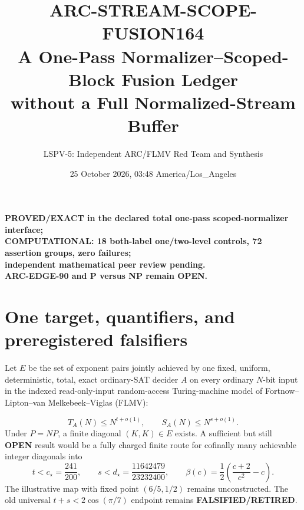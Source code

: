 \documentclass[11pt]{article}
\title{ARC-STREAM-SCOPE-FUSION164\\
\large A One-Pass Normalizer--Scoped-Block Fusion Ledger\\
without a Full Normalized-Stream Buffer}
\author{LSPV-5: Independent ARC/FLMV Red Team and Synthesis}
\date{25 October 2026, 03:48 America/Los\_Angeles}
\newcommand{\OPEN}{\textbf{OPEN}}
\begin{document}
\maketitle

\begin{center}
\textbf{PROVED/EXACT in the declared total one-pass scoped-normalizer interface;}\\
\textbf{COMPUTATIONAL: 18 both-label one/two-level controls, 72 assertion groups, zero failures;}\\
\textbf{independent mathematical peer review pending.}\\
\textbf{ARC-EDGE-90 and P versus NP remain OPEN.}
\end{center}

\section{One target, quantifiers, and preregistered falsifiers}
Let \(E\) be the set of exponent pairs jointly achieved by one fixed,
uniform, deterministic, total, exact ordinary-SAT decider \(A\) on every
ordinary \(N\)-bit input in the indexed read-only-input random-access
Turing-machine model of Fortnow--Lipton--van Melkebeek--Viglas (FLMV):

\[
T_A(N)\le N^{t+o(1)},\qquad S_A(N)\le N^{s+o(1)}.
\]
Under \(P=NP\), a finite diagonal \((K,K)\in E\) exists.  A sufficient but
still \OPEN{} result would be a fully charged finite route for cofinally many
achievable integer diagonals into
\[
t<c_\star=\frac{241}{200},\qquad
s<d_\star=\frac{11642479}{23232400},\qquad
\beta(c)=\frac12\left(\frac{c+2}{c^2}-c\right).
\]
The illustrative map with fixed point \((6/5,1/2)\) remains unconstructed.
The old universal \(t+s<2\cos(\pi/7)\) endpoint remains
\textbf{FALSIFIED/RETIRED}.
\end{document}
